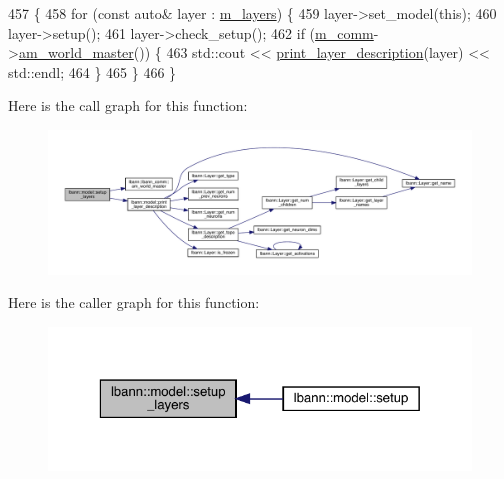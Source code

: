 \begin{DoxyCode}
457                          \{
458   \textcolor{keywordflow}{for} (\textcolor{keyword}{const} \textcolor{keyword}{auto}& layer : \hyperlink{classlbann_1_1model_a0229fc226ec163d1411548446104569d}{m\_layers}) \{
459     layer->set\_model(\textcolor{keyword}{this});
460     layer->setup();
461     layer->check\_setup();
462     \textcolor{keywordflow}{if} (\hyperlink{classlbann_1_1model_a0eabaf2b2f829fd5db3dfd26df420df0}{m\_comm}->\hyperlink{classlbann_1_1lbann__comm_a1ef526486183a29feadca9bef096a534}{am\_world\_master}()) \{
463       std::cout << \hyperlink{classlbann_1_1model_ab173fd93a80a2980059ff292c308cbf5}{print\_layer\_description}(layer) << std::endl;
464     \}
465   \}
466 \}
\end{DoxyCode}
Here is the call graph for this function\+:\nopagebreak
\begin{figure}[H]
\begin{center}
\leavevmode
\includegraphics[width=350pt]{classlbann_1_1model_a989ab581e359f65c9238d627cce5b589_cgraph}
\end{center}
\end{figure}
Here is the caller graph for this function\+:\nopagebreak
\begin{figure}[H]
\begin{center}
\leavevmode
\includegraphics[width=323pt]{classlbann_1_1model_a989ab581e359f65c9238d627cce5b589_icgraph}
\end{center}
\end{figure}
\mbox{\label{classlbann_1_1model_a582edc0f930e1594381ecc7922e91b08}} 
